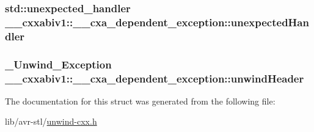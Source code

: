 \hypertarget{struct____cxxabiv1_1_1____cxa__dependent__exception_a96024f9dca222992f78b43661f734879}{
\subsubsection[{unexpected\-Handler}]{\setlength{\rightskip}{0pt plus 5cm}std\-::unexpected\-\_\-handler \-\_\-\-\_\-cxxabiv1\-::\-\_\-\-\_\-cxa\-\_\-dependent\-\_\-exception\-::unexpected\-Handler}}\label{struct____cxxabiv1_1_1____cxa__dependent__exception_a96024f9dca222992f78b43661f734879}
\hypertarget{struct____cxxabiv1_1_1____cxa__dependent__exception_af9053e3aad7c19d930d3ee225b31daad}{
\subsubsection[{unwind\-Header}]{\setlength{\rightskip}{0pt plus 5cm}\-\_\-\-Unwind\-\_\-\-Exception \-\_\-\-\_\-cxxabiv1\-::\-\_\-\-\_\-cxa\-\_\-dependent\-\_\-exception\-::unwind\-Header}}\label{struct____cxxabiv1_1_1____cxa__dependent__exception_af9053e3aad7c19d930d3ee225b31daad}


The documentation for this struct was generated from the following file\-:\begin{DoxyCompactItemize}
\item 
lib/avr-\/stl/\hyperlink{unwind-cxx_8h}{unwind-\/cxx.\-h}\end{DoxyCompactItemize}
